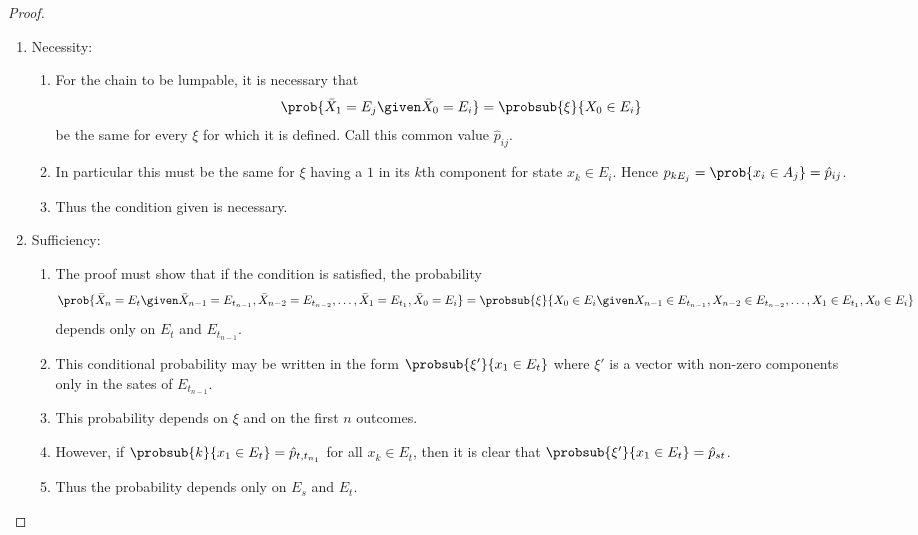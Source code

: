 \documentclass[12pt]{article}
\begin{document}
\begin{proof}
  \begin{enumerate}
  \item Necessity:
    \begin{enumerate}
    \item 
  For the chain to be lumpable, it is necessary that
\[
  \prob{\bar{X}_1 = E_j \given \bar{X}_0 = E_i} = \probsub{\xi}{X_0
  \in E_i }
\]
be the same for every $\xi$ for which it is defined.    Call this
common value $\hat{p}_{ij}$.
\item   In particular this must be the same for
$\xi$ having a $1$ in its $k$th component for state $x_k \in E_i$.
Hence $p_{kE_j} = \prob{x_i \in A_j} = \hat{p}_{ij}$.  
\item Thus the
condition given is necessary.
\end{enumerate}
\item Sufficiency:
  \begin{enumerate}
  \item The proof must show that if the condition is satisfied, the
    probability 
\[
  \prob{\bar{X}_n = E_t \given \bar{X}_{n-1} = E_{t_{n-1}},
    \bar{X}_{n-2} = E_{t_{n-2}}, \dots,  \bar{X}_1 = E_{t_1},
    \bar{X}_0 = E_i} = \probsub{\xi}{X_0 \in E_i \given X_{n-1} \in E_{t_{n-1}},
    X_{n-2} \in E_{t_{n-2}}, \dots,  X_1 \in E_{t_1},
    X_0 \in E_i}
\]
depends only on $E_t$ and $E_{t_{n-1}}$.
\item This conditional probability may be written in the form \(
  \probsub{\xi'}{x_1 \in E_t} \) where $\xi'$ is a vector with
  non-zero components only in the sates of $E_{t_{n-1}}$. 
\item This probability depends on $\xi$ and on the first $n$ outcomes.
\item However, if \( \probsub{k}{x_1 \in E_t} = \hat{p}_{t, t_{n_1}}
  \) for all $x_k \in E_t$, then it is clear that $\probsub{\xi'}{x_1
    \in E_t} = \hat{p}_{st}$.
\item Thus the probability depends only on $E_s$ and $E_t$. 
\end{enumerate}
  \end{enumerate}
\end{proof}
\end{document}
